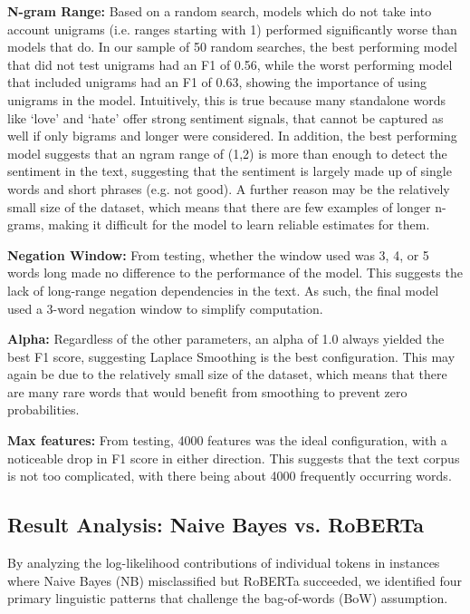 \documentclass[11pt]{article}
\begin{document}
\textbf{N-gram Range:} Based on a random search, models which do not take into account unigrams (i.e. ranges starting with 1) performed significantly worse than models that do. In our sample of 50 random searches, the best performing model that did not test unigrams had an F1 of 0.56, while the worst performing model that included unigrams had an F1 of 0.63, showing the importance of using unigrams in the model. Intuitively, this is true because many standalone words like `love' and `hate' offer strong sentiment signals, that cannot be captured as well if only bigrams and longer were considered. In addition, the best performing model suggests that an ngram range of (1,2) is more than enough to detect the sentiment in the text, suggesting that the sentiment is largely made up of single words and short phrases (e.g. not good). A further reason may be the relatively small size of the dataset, which means that there are few examples of longer n-grams, making it difficult for the model to learn reliable estimates for them.

\textbf{Negation Window:} From testing, whether the window used was 3, 4, or 5 words long made no difference to the performance of the model. This suggests the lack of long-range negation dependencies in the text. As such, the final model used a 3-word negation window to simplify computation.

\textbf{Alpha:} Regardless of the other parameters, an alpha of 1.0 always yielded the best F1 score, suggesting Laplace Smoothing is the best configuration. This may again be due to the relatively small size of the dataset, which means that there are many rare words that would benefit from smoothing to prevent zero probabilities.

\textbf{Max features:} From testing, 4000 features was the ideal configuration, with a noticeable drop in F1 score in either direction. This suggests that the text corpus is not too complicated, with there being about 4000 frequently occurring words.

\subsection{Result Analysis: Naive Bayes vs. RoBERTa}

By analyzing the log-likelihood contributions of individual tokens in instances where Naive Bayes (NB) misclassified but RoBERTa succeeded, we identified four primary linguistic patterns that challenge the bag-of-words (BoW) assumption.
\end{document}
